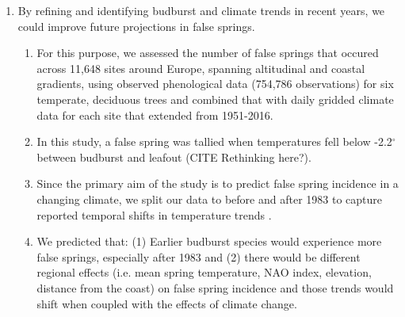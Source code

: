 \documentclass{article}\usepackage[]{graphicx}\usepackage[]{color}
\begin{document}
\begin{enumerate}
\item By refining and identifying budburst and climate trends in recent years, we could improve future projections in false springs. %
\begin{enumerate}
\item For this purpose, we assessed the number of false springs that occured across 11,648 sites around Europe, spanning altitudinal and coastal gradients, using observed phenological data (754,786 observations) for six temperate, deciduous trees and combined that with daily gridded climate data for each site that extended from 1951-2016. %
\item In this study, a false spring was tallied when temperatures fell below -2.2$^{\circ}$ \citep{Schwartz1993} between budburst and leafout (CITE Rethinking here?).
\item Since the primary aim of the study is to predict false spring incidence in a changing climate, we split our data to before and after 1983 to capture reported temporal shifts in temperature trends \citep{Stocker2013, Kharouba2018}.
\item We predicted that: (1) Earlier budburst species would experience more false springs, especially after 1983 and  %
(2) there would be different regional effects (i.e. mean spring temperature, NAO index, elevation, distance from the coast) on false spring incidence and those trends would shift when coupled with the effects of climate change. %
\end{enumerate}
\end{enumerate}
\end{document}
